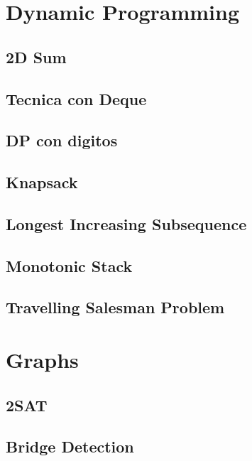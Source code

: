 \section{Dynamic Programming}
\subsection{2D Sum}
\raggedbottom
\hrulefill
\subsection{Tecnica con Deque}
\raggedbottom
\hrulefill
\subsection{DP con digitos}
\raggedbottom
\hrulefill
\subsection{Knapsack}
\raggedbottom
\hrulefill
\subsection{Longest Increasing Subsequence}
\raggedbottom
\hrulefill
\subsection{Monotonic Stack}
\raggedbottom
\hrulefill
\subsection{Travelling Salesman Problem}
\raggedbottom
\hrulefill
\newpage

\section{Graphs}
\subsection{2SAT}
\raggedbottom
\hrulefill
\subsection{Bridge Detection}
\raggedbottom
\hrulefill
